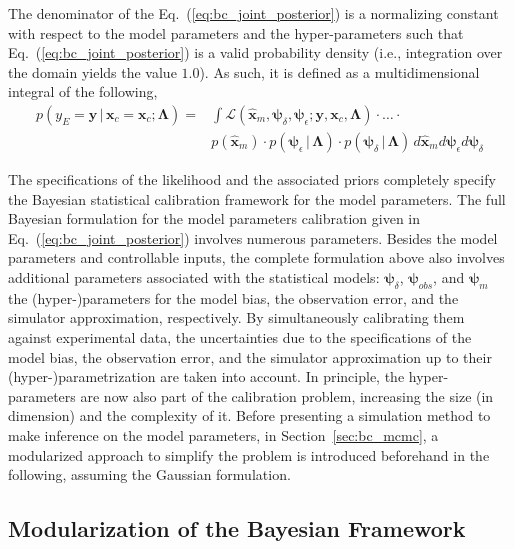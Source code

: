 The denominator of the Eq.~(\ref{eq:bc_joint_posterior}) is a normalizing constant with respect to the model parameters and the hyper-parameters such that Eq.~(\ref{eq:bc_joint_posterior}) is a valid probability density (i.e., integration over the domain yields the value $1.0$).
As such, it is defined as a multidimensional integral of the following,
\begin{equation}
	\begin{split}
	p(y_E = \mathbf{y} \,|\, \bm{x}_c = \mathbf{x}_c ; \bm{\Lambda}) = & \int \mathcal{L}(\hat{\bm{x}}_m,\bm{\psi}_\delta, \bm{\psi}_\epsilon ;  \mathbf{y}, \mathbf{x}_c, \bm{\Lambda}) \cdot \ldots \cdot \\
	& p(\hat{\bm{x}}_m) \cdot p(\bm{\psi}_\epsilon\,|\,\bm{\Lambda}) \cdot p(\bm{\psi}_\delta\,|\,\bm{\Lambda}) \, d\hat{\bm{x}}_m d\bm{\psi}_\epsilon d\bm{\psi}_\delta
	\end{split}
\label{eq:bc_normalizing_constant}
\end{equation}

The specifications of the likelihood and the associated priors completely specify the Bayesian statistical calibration framework for the model parameters.
The full Bayesian formulation for the model parameters calibration given in Eq.~(\ref{eq:bc_joint_posterior}) involves numerous parameters.
Besides the model parameters and controllable inputs, the complete formulation above also involves additional parameters associated with the statistical models: $\bm{\psi}_\delta$, $\bm{\psi}_{obs}$, and $\bm{\psi}_m$ the (hyper-)para\-meters for the model bias, the observation error, and the simulator approximation, respectively.
By simultaneously calibrating them against experimental data,
the uncertainties due to the specifications of the model bias, the observation error, and the simulator approximation up to their (hyper-)parametrization are taken into account.
In principle, the hyper-parameters are now also part of the calibration problem, increasing the size (in dimension) and the complexity of it.
Before presenting a simulation method to make inference on the model parameters, in Section~\ref{sec:bc_mcmc}, 
a modularized approach \cite{Liu2005} to simplify the problem is introduced beforehand in the following, assuming the Gaussian formulation.

\subsection{Modularization of the Bayesian Framework}\label{sub:bc_modularization}

